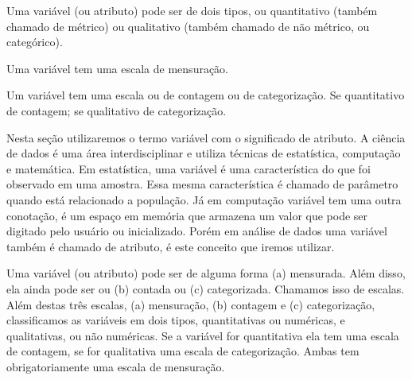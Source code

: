 \begin{tcolorbox}[title=Tipos de variável]
Uma variável (ou atributo) pode ser de dois tipos, ou quantitativo (também chamado de métrico) ou qualitativo (também chamado de não métrico, ou categórico).
\end{tcolorbox}

\begin{tcolorbox}[title=Escalas da variável (Mensuração)]
Uma variável tem uma escala de mensuração.
\end{tcolorbox}

\begin{tcolorbox}[title=Escalas da variável (contagem ou categorização)]
Um variável tem uma escala ou de contagem ou de categorização. Se quantitativo de contagem; se qualitativo de categorização.
\end{tcolorbox}


Nesta seção utilizaremos o termo variável com o significado de atributo. A ciência de dados é uma área interdisciplinar e utiliza técnicas de estatística, computação e matemática. Em estatística, uma variável é uma característica do que foi observado em uma amostra. Essa mesma característica é chamado de parâmetro quando está relacionado a população. Já em computação variável tem uma outra conotação, é um espaço em memória que armazena um valor que pode ser digitado pelo usuário ou inicializado. Porém em análise de dados uma variável também é chamado de atributo, é este conceito que iremos utilizar.


Uma variável (ou atributo) pode ser de alguma forma (a) mensurada. Além disso, ela ainda pode ser ou (b) contada ou (c) categorizada. Chamamos isso de escalas. Além destas três escalas, (a) mensuração, (b) contagem e (c) categorização, classificamos as variáveis em dois tipos, quantitativas ou numéricas, e qualitativas, ou não numéricas. Se a variável for quantitativa ela tem uma escala de contagem, se for qualitativa uma escala de categorização. Ambas tem obrigatoriamente uma escala de mensuração.


